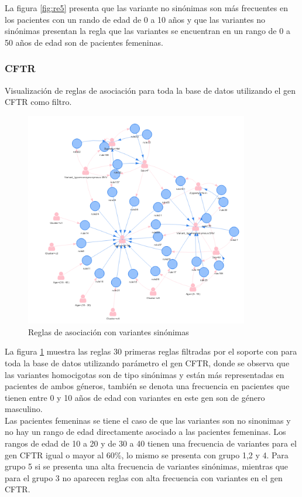 La figura \ref{fig:re5} presenta que las variante no sinónimas son más frecuentes en los pacientes con un rando de edad de 0 a 10 años y que las variantes no sinónimas presentan la regla que las variantes se encuentran en un rango de 0 a 50 años de edad son de pacientes femeninas. 


\subsubsection*{CFTR}

Visualización de reglas de asociación para toda la base de datos utilizando el gen CFTR como filtro. 

\begin{figure}[H]
	\centering
	\includegraphics[width=0.87\textwidth]{Kap4/CFTR1}
	\caption{Reglas de asociación con variantes sinónimas} \label{fig:r6}
\end{figure}

La figura \ref{fig:r6} muestra las reglas 30 primeras reglas filtradas por el soporte con para toda la base de datos utilizando parámetro el gen CFTR, donde se observa que las variantes homocigotas son de tipo sinónimas y están más representadas en pacientes de ambos géneros, también se denota una frecuencia en pacientes que tienen entre 0 y 10 años de edad con variantes en este gen son de género masculino. \\

Las pacientes femeninas se tiene el caso de que las variantes son no sinonimas y no hay un  rango de edad directamente asociado a las pacientes femeninas. Los rangos de edad de 10 a 20 y de 30 a 40 tienen una frecuencia de variantes para el gen CFTR igual o mayor al 60\%, lo mismo se presenta con grupo 1,2 y 4. Para grupo 5 si se presenta una alta frecuencia de variantes sinónimas, mientras que para el grupo 3 no aparecen reglas con alta frecuencia con variantes en el gen CFTR. 

